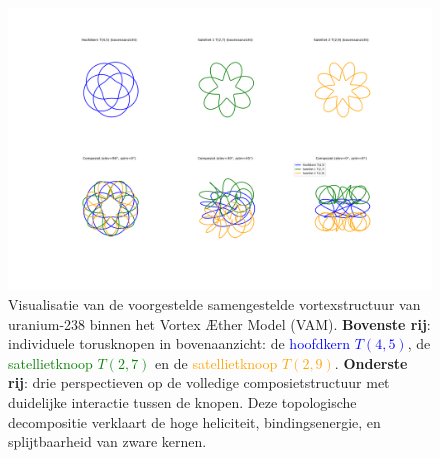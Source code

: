 \begin{figure}[H]
    \centering
    \includegraphics[width=\textwidth]{images/0_UraniumKnoop}
    \caption[Samengestelde vortexstructuur van uranium-238 in VAM]{
        Visualisatie van de voorgestelde samengestelde vortexstructuur van uranium-238 binnen het Vortex Æther Model (VAM).
        \textbf{Bovenste rij}: individuele torusknopen in bovenaanzicht:
        de \textcolor{blue}{hoofdkern \(T(4,5)\)}, de \textcolor{green}{satellietknoop \(T(2,7)\)} en de \textcolor{orange}{satellietknoop \(T(2,9)\)}.
        \textbf{Onderste rij}: drie perspectieven op de volledige composietstructuur met duidelijke interactie tussen de knopen.
        Deze topologische decompositie verklaart de hoge heliciteit, bindingsenergie, en splijtbaarheid van zware kernen.
    }
    \label{fig:uranium_2x3}
\end{figure}

